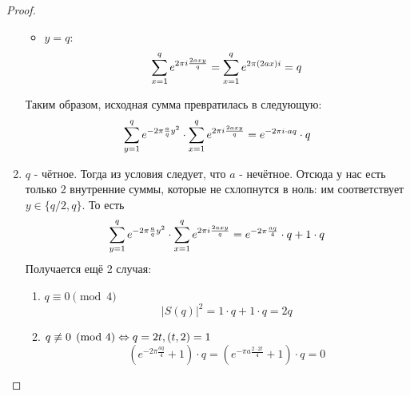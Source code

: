 \begin{proof}
\begin{enumerate}
\begin{itemize}
			\item $y = q$:
			\[
				\sum\limits_{x = 1}^q e^{2\pi i \frac{2axy}{q}} = \sum\limits_{x = 1}^q e^{2\pi(2ax)i} = q
			\]
		\end{itemize}
		Таким образом, исходная сумма превратилась в следующую:
		\[
			\sum\limits_{y = 1}^q e^{-2\pi \frac{a}{q}y^2} \cdot \sum\limits_{x = 1}^q e^{2\pi i \frac{2axy}{q}} = e^{-2\pi i \cdot aq} \cdot q
		\]
		
		\item $q$ - чётное. Тогда из условия следует, что $a$ - нечётное. Отсюда у нас есть только 2 внутренние суммы, которые не схлопнутся в ноль: им соответствует $y \in \{q/2, q\}$. То есть
		\[
			\sum\limits_{y = 1}^q e^{-2\pi \frac{a}{q}y^2} \cdot \sum\limits_{x = 1}^q e^{2\pi i \frac{2axy}{q}} = e^{-2\pi \frac{aq}{4}} \cdot q + 1 \cdot q
		\]
		Получается ещё 2 случая:
		\begin{enumerate}
			\item $q \equiv 0 \pmod 4$
			\[
				|S(q)|^2 = 1 \cdot q + 1 \cdot q = 2q
			\]
			\item $q \not\equiv 0 \pmod 4 \Leftrightarrow q = 2t, (t, 2) = 1$
			\[
				(e^{-2\pi \frac{aq}{4}} + 1) \cdot q = (e^{-\pi a \frac{2 \cdot 2t}{4}} + 1) \cdot q = 0
			\]
		\end{enumerate}
	\end{enumerate}
\end{proof}